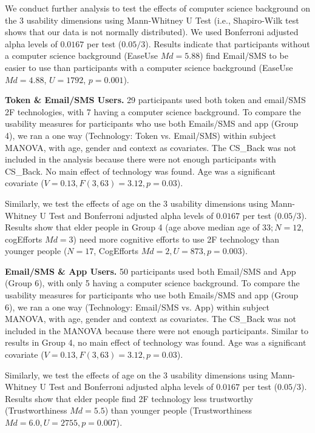 \documentclass[conference]{IEEEtran}
\newcommand{\descr}[1]{\vspace{0.25cm} \noindent \textbf{#1}}
\begin{document}
We conduct further analysis to test the effects of computer science background on the 3 usability dimensions using Mann-Whitney U Test (i.e., Shapiro-Wilk test shows that our data is not normally distributed). We used Bonferroni adjusted alpha levels of $0.0167$ per test ($0.05/3$). Results indicate that participants without a computer science background (EaseUse $Md= 5.88$) find Email/SMS to be easier to use than participants with a computer science background (EaseUse $Md = 4.88$, $U = 1792$, $p = 0.001$).



\descr{Token \& Email/SMS Users.}
29 participants used both token and email/SMS 2F technologies, with 7 having a computer science background. To compare the usability measures for participants who use both Emails/SMS and app (Group 4), we ran a one way (Technology: Token vs. Email/SMS) within subject MANOVA, with age, gender and context as covariates. The CS\_Back was not included in the analysis because there were not enough participants with CS\_Back. No main effect of technology was found. Age was a significant covariate ($V= 0.13, F(3,63)=3.12, p=0.03$).

Similarly, we test the effects of age on the 3 usability dimensions using Mann-Whitney U Test  and Bonferroni adjusted alpha levels of $0.0167$ per test ($0.05/3$). Results show that elder people in Group 4 (age above median age of $33; N = 12$, cogEfforts $Md = 3$) need more cognitive efforts to use 2F technology than younger people ($N=17$, CogEfforts $Md = 2, U = 873, p = 0.003$).



\descr{Email/SMS \& App Users.} 50 participants used both Email/SMS and App (Group 6), with only 5 having a computer science background. To compare the usability measures for participants who use both Emails/SMS and app (Group 6), we ran a one way (Technology: Email/SMS vs. App) within subject MANOVA, with age, gender and context as covariates. The CS\_Back was not included in the MANOVA because there were not enough participants. Similar to results in Group 4, no main effect of technology was found. Age was a significant covariate ($V= 0.13, F(3,63)=3.12, p=0.03$).



Similarly, we test the effects of age on the 3 usability dimensions using Mann-Whitney U Test  and Bonferroni adjusted alpha levels of $0.0167$ per test ($0.05/3$). Results show that elder people find 2F technology less trustworthy (Trustworthiness $Md = 5.5$) than younger people (Trustworthiness $Md=6.0, U=2755, p =0. 007$).
\end{document}
